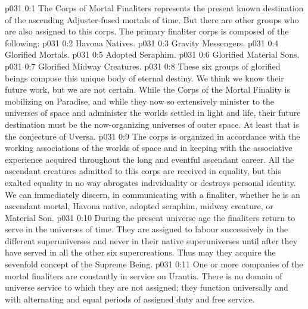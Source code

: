 \author{Divine Counsellor and One Without Name and Number}
\vs p031 0:1 The Corps of Mortal Finaliters represents the present known destination of the ascending Adjuster\hyp{}fused mortals of time. But there are other groups who are also assigned to this corps. The primary finaliter corps is composed of the following:
\vs p031 0:2 \bibnobreakspace Havona Natives.
\vs p031 0:3 \bibnobreakspace Gravity Messengers.
\vs p031 0:4 \bibnobreakspace Glorified Mortals.
\vs p031 0:5 \bibnobreakspace Adopted Seraphim.
\vs p031 0:6 \bibnobreakspace Glorified Material Sons.
\vs p031 0:7 \bibnobreakspace Glorified Midway Creatures.
\vs p031 0:8 \pc These six groups of glorified beings compose this unique body of eternal destiny. We think we know their future work, but we are not certain. While the Corps of the Mortal Finality is mobilizing on Paradise, and while they now so extensively minister to the universes of space and administer the worlds settled in light and life, their future destination must be the now\hyp{}organizing universes of outer space. At least that is the conjecture of Uversa.
\vs p031 0:9 The corps is organized in accordance with the working associations of the worlds of space and in keeping with the associative experience acquired throughout the long and eventful ascendant career. All the ascendant creatures admitted to this corps are received in equality, but this exalted equality in no way abrogates individuality or destroys personal identity. We can immediately discern, in communicating with a finaliter, whether he is an ascendant mortal, Havona native, adopted seraphim, midway creature, or Material Son.
\vs p031 0:10 During the present universe age the finaliters return to serve in the universes of time. They are assigned to labour successively in the different superuniverses and never in their native superuniverses until after they have served in all the other six supercreations. Thus may they acquire the sevenfold concept of the Supreme Being.
\vs p031 0:11 One or more companies of the mortal finaliters are constantly in service on Urantia. There is no domain of universe service to which they are not assigned; they function universally and with alternating and equal periods of assigned duty and free service.
